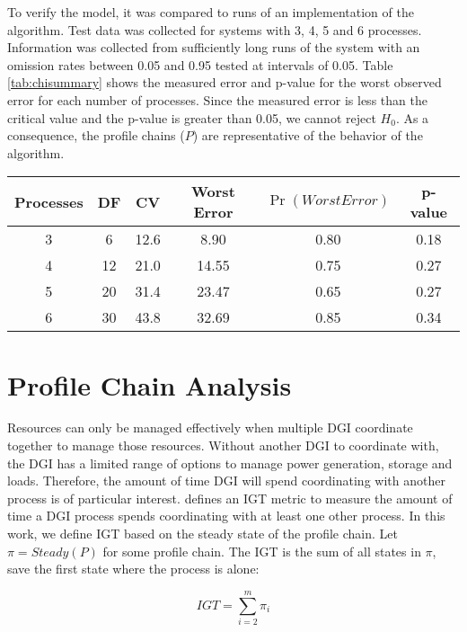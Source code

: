 To verify the model, it was compared to runs of an implementation of the algorithm.
Test data was collected for systems with 3, 4, 5 and 6 processes.
Information was collected from sufficiently long runs of the system with an omission rates between 0.05 and 0.95 tested at intervals of 0.05.
Table \ref{tab:chisummary} shows the measured error and p-value for the worst observed error for each number of processes.
Since the measured error is less than the critical value and the p-value is greater than 0.05, we cannot reject $H_0$. 
As a consequence, the profile chains ($P$) are representative of the behavior of the algorithm.

\begin{table*}[!t]
\centering
\caption{Summary of $\chi^2$ tests performed.}
\begin{tabular}{ c | c c c c c}
  \hline
  Processes & DF & CV & Worst Error & $\Pr(WorstError)$ &  p-value \\ \hline
  3 & 6 & 12.6 & 8.90 & 0.80 & 0.18 \\
  4 & 12 & 21.0 & 14.55 & 0.75 & 0.27 \\
  5 & 20 & 31.4 & 23.47 & 0.65 & 0.27 \\
  6 & 30 & 43.8 & 32.69 & 0.85 & 0.34 \\
\end{tabular}

\label{tab:chisummary}
\end{table*}

\section{Profile Chain Analysis}

Resources can only be managed effectively when multiple \ac{DGI} coordinate together to manage those resources.
Without another DGI to coordinate with, the DGI has a limited range of options to manage power generation, storage and loads.
Therefore, the amount of time DGI will spend coordinating with another process is of particular interest.
\cite{CRITIS2012} defines an \ac{IGT} metric to measure the amount of time a DGI process spends coordinating with at least one other process.
In this work, we define \ac{IGT} based on the steady state of the profile chain.
Let $\pi=Steady(P)$ for some profile chain.
The \ac{IGT} is the sum of all states in $\pi$, save the first state where the process is alone:

\begin{equation} IGT = \sum_{i=2}^{m} \pi_i \end{equation}

